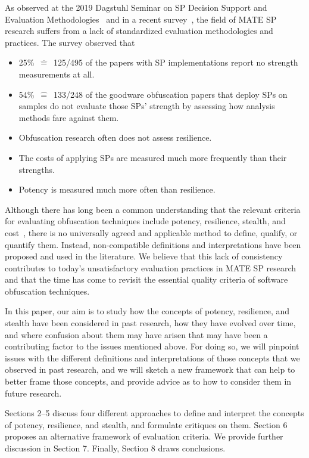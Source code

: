 As observed at the 2019 Dagstuhl Seminar on SP Decision Support and Evaluation Methodologies~\cite{Dagstuhl} and in a recent survey~\cite{desutter2024evaluation}, the field of MATE SP research suffers from a lack of standardized evaluation methodologies and practices. The survey observed that 
\begin{itemize}
    \item 25\%~$\hat{=}$~125/495 of the papers with SP implementations report no strength measurements at all.
    \item 54\%~$\hat{=}$~133/248 of the goodware obfuscation papers that deploy SPs on samples do not evaluate those SPs' strength by assessing how analysis methods fare against them.
    \item Obfuscation research often does not assess resilience.
    \item The costs of applying SPs are measured much more frequently than their strengths.
    \item Potency is measured much more often than resilience.
\end{itemize}

Although there has long been a common understanding that the relevant criteria for evaluating obfuscation techniques include potency, resilience, stealth, and cost~\cite{collberg1997taxonomy,collberg1998manufacturing}, there is no universally agreed and applicable method to define, qualify, or quantify them. 
Instead, non-compatible definitions and interpretations have been proposed and used in the literature. We believe that this lack of consistency contributes to today's unsatisfactory evaluation practices in MATE SP research and that the time has come to revisit the essential quality criteria of software obfuscation techniques.

In this paper, our aim is to study how the concepts of potency, resilience, and stealth have been considered in past research, how they have evolved over time, and where confusion about them may have arisen that may have been a contributing factor to the issues mentioned above. For doing so, we will pinpoint issues with the different definitions and interpretations of those concepts that we observed in past research, and we will sketch a new framework that can help to better frame those concepts, and provide advice as to how to consider them in future research. 

Sections 2--5 discuss four different approaches to define and interpret the concepts of potency, resilience, and stealth, and formulate critiques on them. Section 6 proposes an alternative framework of evaluation criteria. We provide further discussion in Section 7. Finally, Section 8 draws conclusions.

